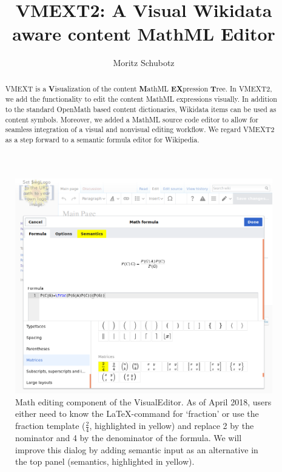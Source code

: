 \documentclass{llncs}
\begin{document}
\title{VMEXT2: A Visual Wikidata aware content MathML Editor}
\author{Moritz Schubotz}
\maketitle

\begin{abstract}
VMEXT is a {\bf V}isualization of the content {\bf M}athML {\bf EX}pression {\bf T}ree.
In VMEXT2, we add the functionality to edit the content MathML expressions visually.
In addition to the standard OpenMath based content dictionaries, Wikidata items can be used as content symbols.
Moreover, we added a MathML source code editor to allow for seamless integration of a visual and nonvisual editing workflow.
We regard VMEXT2 as a step forward to a semantic formula editor for Wikipedia.
\end{abstract}

\begin{figure}[t]
\includegraphics[width=\textwidth]{images/overview.png}
\caption{Math editing component of the VisualEditor.
 As of April 2018, users either need to know the LaTeX-command for `fraction' or use the fraction template ($\frac{2}{4}$, highlighted in yellow) and replace 2 by the nominator and 4 by the denominator of the formula.
 We will improve this dialog by adding semantic input as an alternative in the top panel (semantics, highlighted in yellow).}\label{fig.overview}
\end{figure}
\end{document}
